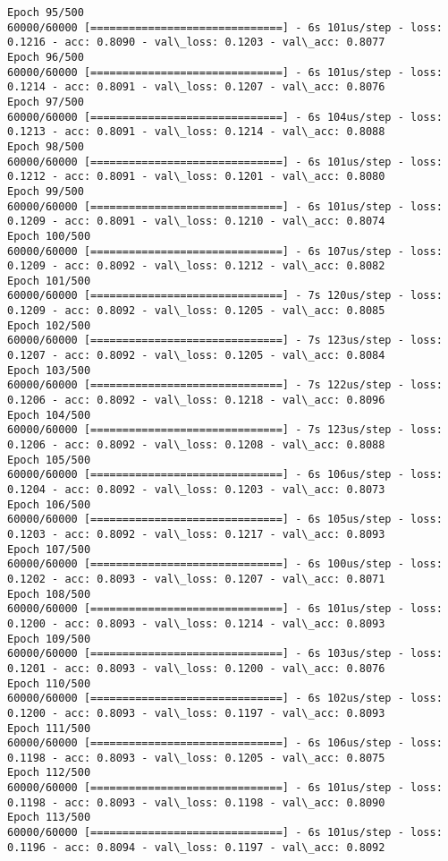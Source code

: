 \documentclass[11pt]{article}
\begin{document}
\begin{Verbatim}[commandchars=\\\{\}]
Epoch 95/500
60000/60000 [==============================] - 6s 101us/step - loss: 0.1216 - acc: 0.8090 - val\_loss: 0.1203 - val\_acc: 0.8077
Epoch 96/500
60000/60000 [==============================] - 6s 101us/step - loss: 0.1214 - acc: 0.8091 - val\_loss: 0.1207 - val\_acc: 0.8076
Epoch 97/500
60000/60000 [==============================] - 6s 104us/step - loss: 0.1213 - acc: 0.8091 - val\_loss: 0.1214 - val\_acc: 0.8088
Epoch 98/500
60000/60000 [==============================] - 6s 101us/step - loss: 0.1212 - acc: 0.8091 - val\_loss: 0.1201 - val\_acc: 0.8080
Epoch 99/500
60000/60000 [==============================] - 6s 101us/step - loss: 0.1209 - acc: 0.8091 - val\_loss: 0.1210 - val\_acc: 0.8074
Epoch 100/500
60000/60000 [==============================] - 6s 107us/step - loss: 0.1209 - acc: 0.8092 - val\_loss: 0.1212 - val\_acc: 0.8082
Epoch 101/500
60000/60000 [==============================] - 7s 120us/step - loss: 0.1209 - acc: 0.8092 - val\_loss: 0.1205 - val\_acc: 0.8085
Epoch 102/500
60000/60000 [==============================] - 7s 123us/step - loss: 0.1207 - acc: 0.8092 - val\_loss: 0.1205 - val\_acc: 0.8084
Epoch 103/500
60000/60000 [==============================] - 7s 122us/step - loss: 0.1206 - acc: 0.8092 - val\_loss: 0.1218 - val\_acc: 0.8096
Epoch 104/500
60000/60000 [==============================] - 7s 123us/step - loss: 0.1206 - acc: 0.8092 - val\_loss: 0.1208 - val\_acc: 0.8088
Epoch 105/500
60000/60000 [==============================] - 6s 106us/step - loss: 0.1204 - acc: 0.8092 - val\_loss: 0.1203 - val\_acc: 0.8073
Epoch 106/500
60000/60000 [==============================] - 6s 105us/step - loss: 0.1203 - acc: 0.8092 - val\_loss: 0.1217 - val\_acc: 0.8093
Epoch 107/500
60000/60000 [==============================] - 6s 100us/step - loss: 0.1202 - acc: 0.8093 - val\_loss: 0.1207 - val\_acc: 0.8071
Epoch 108/500
60000/60000 [==============================] - 6s 101us/step - loss: 0.1200 - acc: 0.8093 - val\_loss: 0.1214 - val\_acc: 0.8093
Epoch 109/500
60000/60000 [==============================] - 6s 103us/step - loss: 0.1201 - acc: 0.8093 - val\_loss: 0.1200 - val\_acc: 0.8076
Epoch 110/500
60000/60000 [==============================] - 6s 102us/step - loss: 0.1200 - acc: 0.8093 - val\_loss: 0.1197 - val\_acc: 0.8093
Epoch 111/500
60000/60000 [==============================] - 6s 106us/step - loss: 0.1198 - acc: 0.8093 - val\_loss: 0.1205 - val\_acc: 0.8075
Epoch 112/500
60000/60000 [==============================] - 6s 101us/step - loss: 0.1198 - acc: 0.8093 - val\_loss: 0.1198 - val\_acc: 0.8090
Epoch 113/500
60000/60000 [==============================] - 6s 101us/step - loss: 0.1196 - acc: 0.8094 - val\_loss: 0.1197 - val\_acc: 0.8092

\end{Verbatim}
\end{document}

